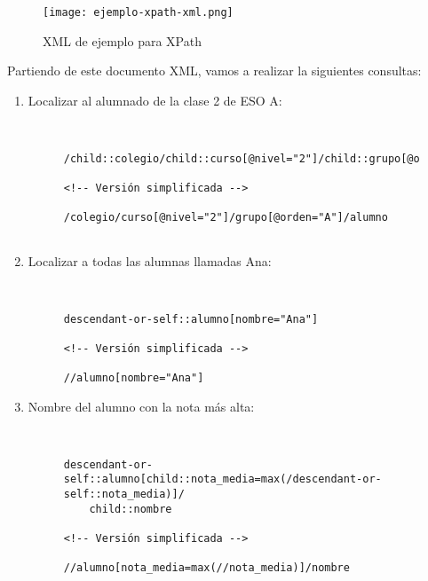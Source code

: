 \begin{figure}[H]
    \centering
    \texttt{[image: ejemplo-xpath-xml.png]}
    \caption{XML de ejemplo para XPath}
\end{figure}

Partiendo de este documento XML, vamos a realizar la siguientes consultas:

\begin{enumerate}
    \item Localizar al alumnado de la clase 2 de ESO A:

    \begin{figure}[h]
        \begin{tcolorbox}[sharp corners, colback=yellow!30, colframe=white!20]
            \scriptsize
            \begin{verbatim}


/child::colegio/child::curso[@nivel="2"]/child::grupo[@orden="A"]/child::alumno

<!-- Versión simplificada -->

/colegio/curso[@nivel="2"]/grupo[@orden="A"]/alumno


            \end{verbatim}
        \end{tcolorbox}
    \end{figure}

    \item Localizar a todas las alumnas llamadas Ana:

    \begin{figure}[H]
        \begin{tcolorbox}[sharp corners, colback=yellow!30, colframe=white!20]
            \scriptsize
            \begin{verbatim}


descendant-or-self::alumno[nombre="Ana"]

<!-- Versión simplificada -->

//alumno[nombre="Ana"]

            \end{verbatim}
        \end{tcolorbox}
    \end{figure}

    \item Nombre del alumno con la nota más alta:

    \begin{figure}[H]
        \begin{tcolorbox}[sharp corners, colback=yellow!30, colframe=white!20]
            \scriptsize
            \begin{verbatim}


descendant-or-self::alumno[child::nota_media=max(/descendant-or-self::nota_media)]/
    child::nombre

<!-- Versión simplificada -->

//alumno[nota_media=max(//nota_media)]/nombre
            \end{verbatim}
        \end{tcolorbox}
    \end{figure}
\end{enumerate}

